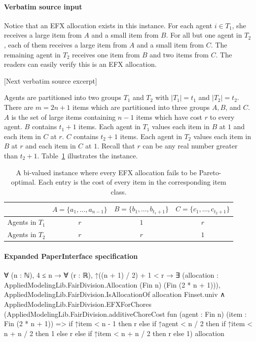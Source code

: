 \documentclass[10pt]{article}
\begin{document}
\paragraph{Verbatim source input}
\begin{ReviewVerbatim}
Notice that an EFX allocation exists in this instance.
For each agent $i\in T_1$, she receives a large item from $A$ and a small item from $B$.
For all but one agent in $T_2$, each of them receives a large item from $A$ and a small item from $C$.
The remaining agent in $T_2$ receives one item from $B$ and two items from $C$.
The readers can easily verify this is an EFX allocation.

[Next verbatim source excerpt]

Agents are partitioned into two groups $T_1$ and $T_2$ with $|T_1|=t_1$ and $|T_2|=t_2$.
There are $m=2n+1$ items which are partitioned into three groups $A,B$, and $C$.
$A$ is the set of large items containing $n-1$ items which have cost $r$ to every agent.
$B$ contains $t_1+1$ items.
Each agent in $T_1$ values each item in $B$ at $1$ and each item in $C$ at $r$.
$C$ contains $t_2+1$ items.
Each agent in $T_2$ values each item in $B$ at $r$ and each item in $C$ at $1$.
Recall that $r$ can be any real number greater than $t_2+1$.
Table~\ref{tab:po} illustrates the instance.

\begin{table}[h]
    \centering
    \caption{A bi-valued instance where every EFX allocation fails to be Pareto-optimal.  Each entry is the cost of every item in the corresponding item class.}
    \begin{tabular}{cccc}
    \hline
         & $A=\{a_1,\ldots,a_{n-1}\}$ & $B=\{b_1,\ldots,b_{t_1+1}\}$ & $C=\{c_1,\ldots,c_{t_2+1}\}$\\
    \hline
       Agents in $T_1$ & $r$ & $1$ & $r$\\
       Agents in $T_2$ & $r$ & $r$ & $1$\\
    \hline
    \end{tabular}

    \label{tab:po}
\end{table}
\end{ReviewVerbatim}



\paragraph{Expanded PaperInterface specification}
\begin{ReviewVerbatim}
∀ (n : ℕ),
  4 ≤ n →
    ∀ (r : ℝ),
      ↑((n + 1) / 2) + 1 < r →
        ∃ (allocation : AppliedModelingLib.FairDivision.Allocation (Fin n) (Fin (2 * n + 1))),
          AppliedModelingLib.FairDivision.IsAllocationOf allocation Finset.univ ∧
            AppliedModelingLib.FairDivision.EFXForChores
              (AppliedModelingLib.FairDivision.additiveChoreCost fun (agent : Fin n) (item : Fin (2 * n + 1)) =>
                if ↑item < n - 1 then r
                else if ↑agent < n / 2 then if ↑item < n + n / 2 then 1 else r else if ↑item < n + n / 2 then r else 1)
              allocation
\end{ReviewVerbatim}
\end{document}

